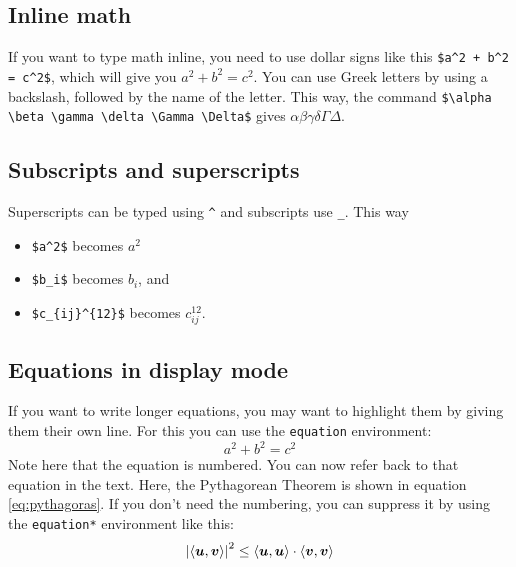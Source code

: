 \documentclass[letterus,times]{SIOpset}
\begin{document}
\subsection{Inline math}
If you want to type math inline, you need to use dollar signs like this \verb|$a^2 + b^2 = c^2$|, which will give you $a^2 + b^2 = c^2$.
You can use Greek letters by using a backslash, followed by the name of the letter. This way, the command \verb|$\alpha \beta \gamma \delta \Gamma \Delta$|
gives $\alpha \beta \gamma \delta \Gamma \Delta$.

\subsection{Subscripts and superscripts}
Superscripts can be typed using \verb|^| and subscripts use \verb|_|. This way 
\begin{itemize}
    \item \verb|$a^2$| becomes $a^2$
    \item \verb|$b_i$| becomes $b_i$, and
    \item \verb|$c_{ij}^{12}$| becomes $c_{ij}^{12}$.
\end{itemize}

\subsection{Equations in display mode}
If you want to write longer equations, you may want to highlight them by giving them their own line. For this you can use the \verb|equation| environment:
\begin{equation} \label{eq:pythagoras}
    a^2 + b^2 = c^2
\end{equation}
Note here that the equation is numbered. You can now refer back to that equation in the text. Here, the Pythagorean Theorem is shown in equation \ref{eq:pythagoras}.
If you don't need the numbering, you can suppress it by using the \verb|equation*| environment like this: 
\begin{equation*}
    \left\lvert\left\langle\bm u, \bm v\right\rangle\right\rvert^2 \leq \left\langle\bm u, \bm u\right\rangle \cdot \left\langle\bm v, \bm v\right\rangle
\end{equation*}
\end{document}
